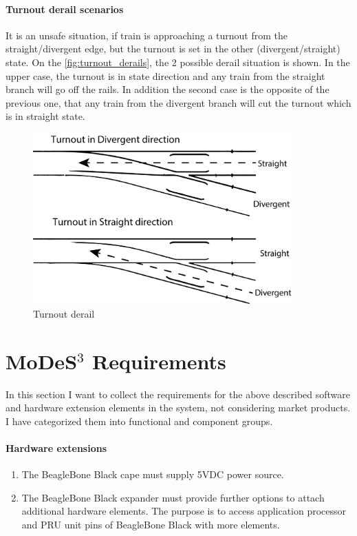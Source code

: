 \paragraph{Turnout derail scenarios}
It is an unsafe situation, if train is approaching a turnout from the straight/divergent edge, but the turnout is set in the other (divergent/straight) state. On the \autoref{fig:turnout_derails}, the 2 possible derail situation is shown. In the upper case, the turnout is in state direction and any train from the straight branch will go off the rails. In addition the second case is the opposite of the previous one, that any train from the divergent branch will cut the turnout which is in straight state.
\begin{figure}[!h]
	\centering
	\includegraphics[width=100mm, keepaspectratio]{figures/modes3/turnout_derail.png}
	\caption{Turnout derail}
	\label{fig:turnout_derails}
\end{figure}

\section{MoDeS$^3$ Requirements}\label{section:REQ}
In this section I want to collect the requirements for the above described software and hardware extension elements in the system, not considering market products. I have categorized them into functional and component groups.


\paragraph{Hardware extensions}
\begin{enumerate}[label=REQ-BBB-\arabic*, leftmargin=*, format=\small]
	\item The BeagleBone Black cape must supply 5VDC power source.
	\item The BeagleBone Black expander must provide further options to attach additional hardware elements. The purpose is to access application processor and PRU unit pins of BeagleBone Black with more elements.
\end{enumerate}

